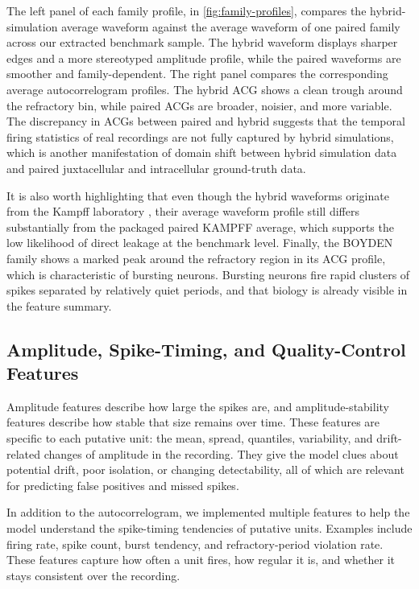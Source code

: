 The left panel of each family profile, in \cref{fig:family-profiles}, compares the hybrid-simulation average waveform against the average waveform of one paired family across our extracted benchmark sample. The hybrid waveform displays sharper edges and a more stereotyped amplitude profile, while the paired waveforms are smoother and family-dependent. The right panel compares the corresponding average autocorrelogram profiles. The hybrid ACG shows a clean trough around the refractory bin, while paired ACGs are broader, noisier, and more variable. The discrepancy in ACGs between paired and hybrid suggests that the temporal firing statistics of real recordings are not fully captured by hybrid simulations, which is another manifestation of domain shift between hybrid simulation data and paired juxtacellular and intracellular ground-truth data.

It is also worth highlighting that even though the hybrid waveforms originate from the Kampff laboratory \parencite{Neto2016Paired}, their average waveform profile still differs substantially from the packaged paired KAMPFF \parencite{Neto2016Paired} average, which supports the low likelihood of direct leakage at the benchmark level. Finally, the BOYDEN family \parencite{doi:10.1152/jn.00650.2017} shows a marked peak around the refractory region in its ACG profile, which is characteristic of bursting neurons. Bursting neurons fire rapid clusters of spikes separated by relatively quiet periods, and that biology is already visible in the feature summary.

\subsection{Amplitude, Spike-Timing, and Quality-Control Features}

Amplitude features describe how large the spikes are, and amplitude-stability features describe how stable that size remains over time. These features are specific to each putative unit: the mean, spread, quantiles, variability, and drift-related changes of amplitude in the recording. They give the model clues about potential drift, poor isolation, or changing detectability, all of which are relevant for predicting false positives and missed spikes.

In addition to the autocorrelogram, we implemented multiple features to help the model understand the spike-timing tendencies of putative units. Examples include firing rate, spike count, burst tendency, and refractory-period violation rate. These features capture how often a unit fires, how regular it is, and whether it stays consistent over the recording.

